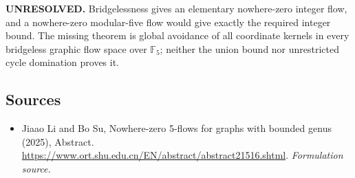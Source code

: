 \documentclass[11pt]{article}
\begin{document}
\textbf{UNRESOLVED.} Bridgelessness gives an elementary nowhere-zero integer flow, and a nowhere-zero modular-five flow would give exactly the required integer bound. The missing theorem is global avoidance of all coordinate kernels in every bridgeless graphic flow space over $\mathbb F_5$; neither the union bound nor unrestricted cycle domination proves it.

\subsection{Sources}
\begin{itemize}
\item[S1]Jiaao Li and Bo Su, Nowhere-zero 5-flows for graphs with bounded genus (2025), Abstract.
\url{https://www.ort.shu.edu.cn/EN/abstract/abstract21516.shtml}.
\textit{Formulation source.}
\end{itemize}
\end{document}
